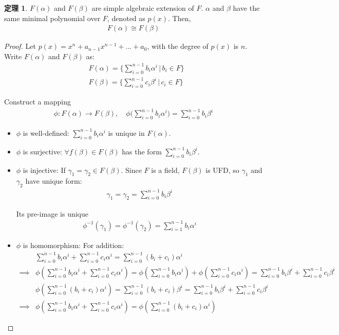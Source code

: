 \documentclass[utf8]{ctexbook}
\theoremstyle{definition}
\newtheorem{prototheorem}{定理}[section]
\newenvironment{theorem}
   {\colorlet{shadecolor}{red!30}\begin{shaded}\begin{prototheorem}}
   {\end{prototheorem}\end{shaded}}
\begin{document}
\begin{theorem}
\label{theorem_4_2_iso_simple_alge_extension}
$F(\alpha)$ and $F(\beta)$ are simple algebraic extension of $F$. $\alpha$ and $\beta$ have the same minimal polynomial over $F$, denoted as $p(x)$. Then, 
\begin{align*}
F(\alpha) \cong F(\beta)
\end{align*}
\end{theorem}


\begin{proof}
Let $p(x) = x^n + a_{n-1} x^{n-1} + \ldots + a_0$, with the degree of $p(x)$ is $n$. Write $F(\alpha)$ and $F(\beta)$ as:
\begin{align*}
& F(\alpha) = \{ \sum_{i=0}^{n-1} b_i \alpha^i \, | \, b_i \in F \} \\
& F(\beta) = \{ \sum_{i=0}^{n-1} c_i \beta^i \, | \, c_i \in F \} 
\end{align*}

Construct a mapping
\begin{align*}
\phi: F(\alpha) \longrightarrow F(\beta), \quad \phi\Big(\sum_{i=0}^{n-1} b_i \alpha^i \Big) = \sum_{i=0}^{n-1} b_i \beta^i
\end{align*}

\begin{itemize}
\item{$\phi$ is well-defined: $\sum_{i=0}^{n-1} b_i \alpha^i $ is unique in $F(\alpha)$.}
\item{$\phi$ is surjective: $\forall f(\beta) \in F(\beta)$ has the form $\sum_{i=0}^{n-1} b_i \beta^i$.}
\item{$\phi$ is injective: If $\gamma_1 = \gamma_2 \in F(\beta)$. Since $F$ is a field, $F(\beta)$ is UFD, so $\gamma_1 $ and $\gamma_2$ have unique form:
\begin{align*}
\gamma_1 = \gamma_2 = \sum_{i=0}^{n-1} b_i \beta^i
\end{align*}

Its pre-image is unique
\begin{align*}
\phi^{-1} (\gamma_1 ) = \phi^{-1} (\gamma_2) = \sum_{i=1} ^{n-1} b_i \alpha^i
\end{align*}
}
\item{$\phi$ is homomorphism: 
For addition:
\begin{align*}
& \sum_{i=0}^{n-1} b_i \alpha^i + \sum_{i=0}^{n-1} c_i \alpha^i = \sum_{i=0}^{n-1} (b_i+ c_i) \alpha^i \\
\implies & \phi(\sum_{i=0}^{n-1} b_i \alpha^i + \sum_{i=0}^{n-1} c_i \alpha^i ) = \phi(\sum_{i=0}^{n-1} b_i \alpha^i) + \phi( \sum_{i=0}^{n-1} c_i \alpha^i ) 
= \sum_{i=0}^{n-1} b_i \beta^i + \sum_{i=0}^{n-1} c_i \beta^i \\
 & \phi( \sum_{i=0}^{n-1} (b_i+ c_i) \alpha^i) = \sum_{i=0}^{n-1} (b_i+ c_i) \beta^i 
 = \sum_{i=0}^{n-1} b_i \beta^i + \sum_{i=0}^{n-1} c_i \beta^i \\
 \implies & \phi(\sum_{i=0}^{n-1} b_i \alpha^i + \sum_{i=0}^{n-1} c_i \alpha^i )  = \phi( \sum_{i=0}^{n-1} (b_i+ c_i) \alpha^i) 
\end{align*}

}
\end{itemize}
\end{proof}
\end{document}
